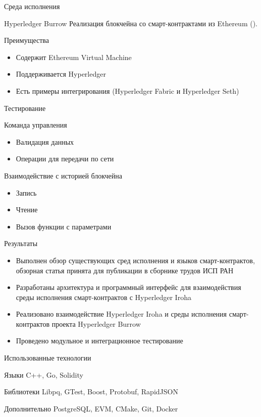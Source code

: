 \documentclass[hyperref={pdfpagelabels=false}]{beamer}
\begin{document}
\begin{frame}{Среда исполнения}
\begin{block}{Hyperledger Burrow}
Реализация блокчейна со смарт-контрактами из Ethereum ({\color{blue}{https://github.com/hyperledger/burrow}}).
\end{block}
\vfill
\begin{block}{Преимущества}
\begin{itemize}
\item Содержит Ethereum Virtual Machine
\vfill
\item Поддерживается Hyperledger
\vfill
\item Есть примеры интегрирования (Hyperledger Fabric и Hyperledger Seth)
\end{itemize}
\end{block}

\end{frame} 

\begin{frame}{Тестирование}
\begin{block}{Команда управления}
\begin{itemize}
\item Валидация данных
\vfill
\item Операции для передачи по сети
\end{itemize}
\end{block}
\vfill
\begin{block}{Взаимодействие с историей блокчейна}
\begin{itemize}
\item Запись
\vfill
\item Чтение
\vfill
\item Вызов функции с параметрами
\end{itemize}
\end{block}
\end{frame} 

\begin{frame}{Результаты}
\begin{itemize}
\item Выполнен обзор существующих сред исполнения и языков смарт-контрактов, обзорная статья принята для публикации в сборнике трудов ИСП РАН
\vfill
\item Разработаны архитектура и программный интерфейс для взаимодействия среды исполнения смарт-контрактов с Hyperledger Iroha
\vfill
\item Реализовано взаимодействие Hyperledger Iroha и среды исполнения смарт-контрактов проекта Hyperledger Burrow
\vfill
\item Проведено модульное и интеграционное тестирование
\end{itemize}
\end{frame} 

\begin{frame}{Использованные технологии}
\begin{block}{Языки}
	C++, Go, Solidity
\end{block}
\vfill
\begin{block}{Библиотеки}
	Libpq, GTest, Boost, Protobuf, RapidJSON
\end{block}
\vfill
\begin{block}{Дополнительно}
	PostgreSQL, EVM, CMake, Git, Docker
\end{block}

\end{frame} 
\end{document}
